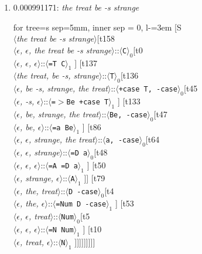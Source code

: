 \documentclass[11pt]{article}
\begin{document}
\begin{enumerate}
	\item  0.000991171: \textit{the treat be -s strange} \\[0.5em]
	\begin{adjustbox}{max width = \textwidth}
	\begin{forest}
	for tree={s sep=5mm, inner sep = 0, l-=3em}
	[S\\$\langle$\textit{the treat be -s strange}$\rangle$[t158\\$\langle$\textit{$\epsilon${,} $\epsilon${,} the treat be -s strange}$\rangle$::$\langle$\texttt{C}$\rangle_0$[t0\\$\langle$\textit{$\epsilon${,} $\epsilon${,} $\epsilon$}$\rangle$::$\langle$\texttt{{=}T C}$\rangle_1$ ] [t137\\$\langle$\textit{the treat{,} be -s{,} strange}$\rangle$::$\langle$\texttt{T}$\rangle_0$[t136\\$\langle$\textit{$\epsilon${,} be -s{,} strange{,} the treat}$\rangle$::$\langle$\texttt{+case T{,} -case}$\rangle_0$[t45\\$\langle$\textit{$\epsilon${,} -s{,} $\epsilon$}$\rangle$::$\langle$\texttt{{=}$>$Be +case T}$\rangle_1$ ] [t133\\$\langle$\textit{$\epsilon${,} be{,} strange{,} the treat}$\rangle$::$\langle$\texttt{Be{,} -case}$\rangle_0$[t47\\$\langle$\textit{$\epsilon${,} be{,} $\epsilon$}$\rangle$::$\langle$\texttt{{=}a Be}$\rangle_1$ ] [t86\\$\langle$\textit{$\epsilon${,} $\epsilon${,} strange{,} the treat}$\rangle$::$\langle$\texttt{a{,} -case}$\rangle_0$[t64\\$\langle$\textit{$\epsilon${,} $\epsilon${,} strange}$\rangle$::$\langle$\texttt{{=}D a}$\rangle_0$[t48\\$\langle$\textit{$\epsilon${,} $\epsilon${,} $\epsilon$}$\rangle$::$\langle$\texttt{{=}A {=}D a}$\rangle_1$ ] [t50\\$\langle$\textit{$\epsilon${,} strange{,} $\epsilon$}$\rangle$::$\langle$\texttt{A}$\rangle_1$ ]] [t79\\$\langle$\textit{$\epsilon${,} the{,} treat}$\rangle$::$\langle$\texttt{D -case}$\rangle_0$[t4\\$\langle$\textit{$\epsilon${,} the{,} $\epsilon$}$\rangle$::$\langle$\texttt{{=}Num D -case}$\rangle_1$ ] [t53\\$\langle$\textit{$\epsilon${,} $\epsilon${,} treat}$\rangle$::$\langle$\texttt{Num}$\rangle_0$[t5\\$\langle$\textit{$\epsilon${,} $\epsilon${,} $\epsilon$}$\rangle$::$\langle$\texttt{{=}N Num}$\rangle_1$ ] [t10\\$\langle$\textit{$\epsilon${,} treat{,} $\epsilon$}$\rangle$::$\langle$\texttt{N}$\rangle_1$ ]]]]]]]]]

\end{forest}
\end{adjustbox}
\end{enumerate}
\end{document}
